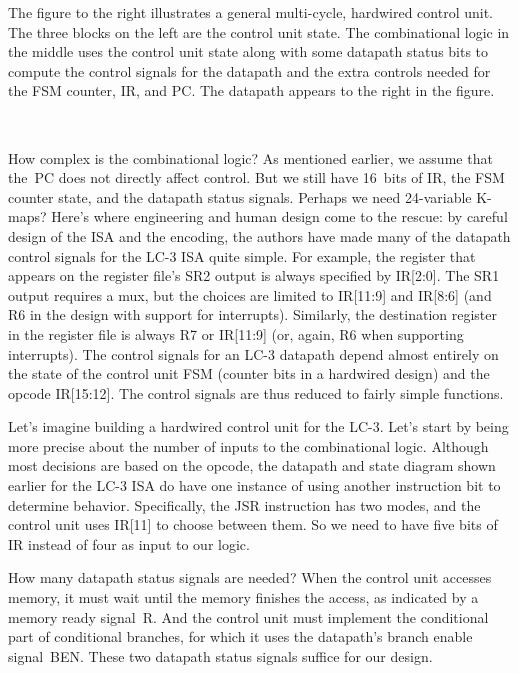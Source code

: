 \begin{minipage}{1.75in}
The figure to the right illustrates a general 
multi-cycle, hardwired control unit.  The three blocks on
the left are the control unit state.  The combinational logic in
the middle uses the control unit state along with some
datapath status bits to compute the control signals for the datapath
and the extra controls needed for the FSM counter, IR, and PC.
The datapath appears to the right in the figure.
\end{minipage}\hspace{0.25in}%
\begin{minipage}{4.5in}
\\
\end{minipage}

How complex is the combinational logic?  As mentioned earlier, we 
assume that the~PC does not directly affect control.  But we still 
have 16~bits of IR, the FSM counter state, and the datapath status
signals.  Perhaps we need 24-variable \mbox{K-maps}?  
%
Here's where engineering and human design come to 
the rescue: by careful design of the ISA and the encoding, the
authors have made many of the datapath control signals for the \mbox{LC-3}
ISA quite simple.
For example, the register that appears on the register file's SR2
output is always specified by IR[2:0].  The SR1 output 
requires a mux, but the choices are limited to IR[11:9] and IR[8:6]
(and R6 in the design with support for interrupts).
Similarly, the destination register in the register file
is always R7 or IR[11:9] (or, again, R6 when supporting interrupts).
%
The control signals for an \mbox{LC-3}
datapath depend almost entirely on the state of the control unit 
FSM (counter bits in a hardwired design) and the opcode IR[15:12].
%
The control signals are thus reduced to fairly simple functions.

Let's imagine building a hardwired control unit for the \mbox{LC-3}.
%
Let's start by being more precise about the number of inputs to
the combinational logic.
%
Although most decisions are based on the opcode, the datapath
and state diagram shown earlier for the \mbox{LC-3} ISA do have
one instance of using another instruction bit to determine behavior.
Specifically, the JSR instruction has two modes, and the control
unit uses IR[11] to choose between them.  So we need to have
five bits of IR instead of four as input to our logic.

How many datapath status signals are needed?
%
When the control unit accesses memory, it must wait until the 
memory finishes the access, as indicated by a memory ready signal~R.
And the control unit must implement the conditional part of conditional
branches, for which it uses the datapath's branch enable signal~BEN.
%
These two datapath status signals suffice for our design.

